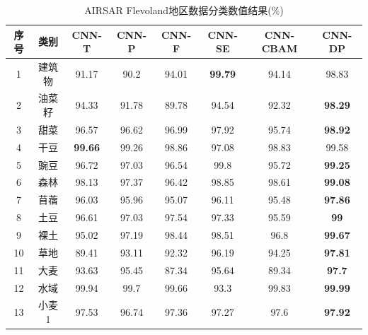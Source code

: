 \begin{table}[ht!]
    \label{tab:fle_res}
    \caption{AIRSAR Flevoland地区数据分类数值结果(\%)}
    \renewcommand\arraystretch{1.0}
    \begin{tabular}{cccccccc}
        \toprule[1.5bp]
        序号                        & 类别    & CNN-T          & CNN-P & CNN-F & CNN-SE         & CNN-CBAM       & CNN-DP         \\
        \midrule[0.75bp]
        1                         & 建筑物   & 91.17          & 90.2  & 94.01 & \textbf{99.79} & 94.14          & 98.83          \\
        2                         & 油菜籽   & 94.33          & 91.78 & 89.78 & 94.54          & 92.32          & \textbf{98.29} \\
        3                         & 甜菜    & 96.57          & 96.62 & 96.99 & 97.92          & 95.74          & \textbf{98.92} \\
        4                         & 干豆    & \textbf{99.66} & 99.26 & 98.86 & 97.08          & 98.83          & 99.58          \\
        5                         & 豌豆    & 96.72          & 97.03 & 96.54 & 99.8           & 95.72          & \textbf{99.25} \\
        6                         & 森林    & 98.13          & 97.37 & 96.42 & 98.85          & 98.61          & \textbf{99.08} \\
        7                         & 苜蓿    & 96.03          & 95.96 & 95.07 & 96.11          & 95.48          & \textbf{97.86} \\
        8                         & 土豆    & 96.61          & 97.03 & 97.54 & 97.33          & 95.59          & \textbf{99}    \\
        9                         & 裸土    & 95.02          & 97.19 & 98.44 & 98.51          & 96.8           & \textbf{99.67} \\
        10                        & 草地    & 89.41          & 93.11 & 92.32 & 96.19          & 94.25          & \textbf{97.81} \\
        11                        & 大麦    & 93.63          & 95.45 & 87.34 & 95.64          & 89.34          & \textbf{97.7}  \\
        12                        & 水域    & 99.94          & 99.7  & 99.66 & 93.3           & 99.83          & \textbf{99.99} \\
        13                        & 小麦 1  & 97.53          & 96.74 & 97.36 & 97.27          & 97.6           & \textbf{97.92} \\

\end{tabular}
\end{table}
